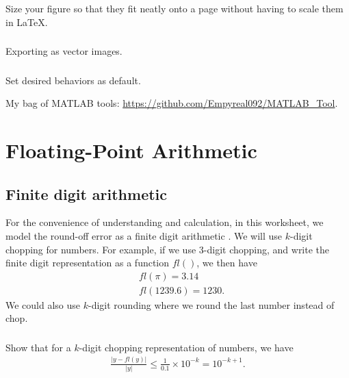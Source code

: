\documentclass[11pt,letterpaper]{report}
\begin{document}
\subsection{}
Size your figure so that they fit neatly onto a page without having to scale them in \LaTeX. 

\subsection{}
Exporting as vector images.

\subsection{}
Set desired behaviors as default.

\vspace{5mm}
My bag of MATLAB tools: \url{https://github.com/Empyreal092/MATLAB_Tool}.
\chapter{Floating-Point Arithmetic}
\section{Finite digit arithmetic}
For the convenience of understanding and calculation, in this worksheet, we model the round-off error as a finite digit arithmetic \cite{BurdenFaires_10}. We will use $k$-digit chopping for numbers. For example, if we use 3-digit chopping, and write the finite digit representation as a function $fl()$, we then have
\begin{align*}
    &fl(\pi) = 3.14\\
    &fl(1239.6) = 1230. 
\end{align*}
We could also use $k$-digit rounding where we round the last number instead of chop.

\subsection{}
Show that for a $k$-digit chopping representation of numbers, we have
\begin{align*}
    \frac{|y-fl(y)|}{|y|}\leq \frac{1}{0.1}\times 10^{-k} = 10^{-k+1}.
\end{align*}
\end{document}
